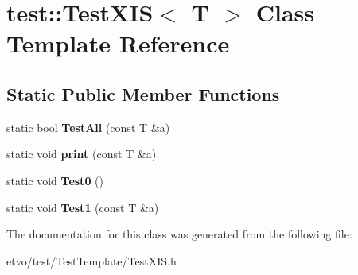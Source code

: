 \hypertarget{classtest_1_1_test_x_i_s}{}\section{test\+:\+:Test\+X\+IS$<$ T $>$ Class Template Reference}
\label{classtest_1_1_test_x_i_s}
\subsection*{Static Public Member Functions}
\begin{DoxyCompactItemize}
\item 
\mbox{\label{classtest_1_1_test_x_i_s_a34d81d76417c2cbe54b09c915d0398e4}} 
static bool {\bfseries Test\+All} (const T \&a)
\item 
\mbox{\label{classtest_1_1_test_x_i_s_ad0e8b1c8b4d38f77003ffacc66ef1f30}} 
static void {\bfseries print} (const T \&a)
\item 
\mbox{\label{classtest_1_1_test_x_i_s_a5369d11d51e6ede95f5f7c5600454f1d}} 
static void {\bfseries Test0} ()
\item 
\mbox{\label{classtest_1_1_test_x_i_s_a817db83540cd8ef5bf1f6d50f641b363}} 
static void {\bfseries Test1} (const T \&a)
\end{DoxyCompactItemize}


The documentation for this class was generated from the following file\+:\begin{DoxyCompactItemize}
\item 
etvo/test/\+Test\+Template/Test\+X\+I\+S.\+h\end{DoxyCompactItemize}
